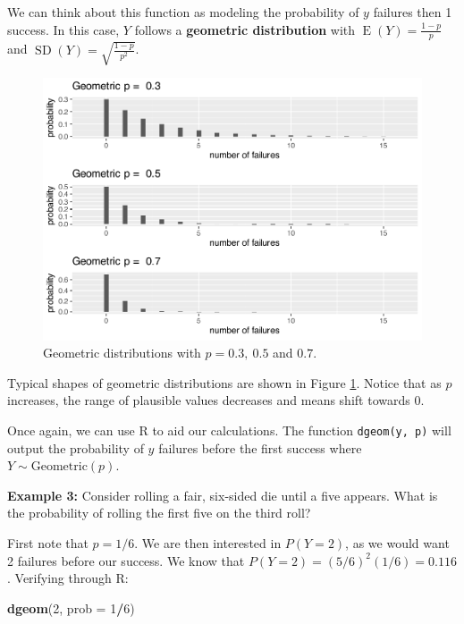 \documentclass[
]{krantz}
\newenvironment{Shaded}{\begin{snugshade}}{\end{snugshade}}
\newcommand{\DataTypeTok}[1]{\textcolor[rgb]{0.27,0.27,0.27}{#1}}
\newcommand{\DecValTok}[1]{\textcolor[rgb]{0.06,0.06,0.06}{#1}}
\newcommand{\KeywordTok}[1]{\textcolor[rgb]{0.27,0.27,0.27}{\textbf{#1}}}
\newcommand{\NormalTok}[1]{#1}
\newcommand{\OperatorTok}[1]{\textcolor[rgb]{0.43,0.43,0.43}{\textbf{#1}}}
\newcommand{\E}{\operatorname{E}}
\newcommand{\SD}{\operatorname{SD}}
\begin{document}
We can think about this function as modeling the probability of \(y\) failures then 1 success. In this case, \(Y\) follows a \textbf{geometric distribution}  with \(\E(Y) = \frac{1-p}p\) and \(\SD(Y) = \sqrt{\frac{1-p}{p^2}}\).



\begin{figure}

{\centering \includegraphics[width=0.6\linewidth]{bookdown-BeyondMLR_files/figure-latex/multGeo-1} 

}

\caption{Geometric distributions with \(p = 0.3,\ 0.5\) and \(0.7\).}\label{fig:multGeo}
\end{figure}

Typical shapes of geometric distributions are shown in Figure \ref{fig:multGeo}. Notice that as \(p\) increases, the range of plausible values decreases and means shift towards 0.

Once again, we can use R to aid our calculations. The function \texttt{dgeom(y,\ p)} will output the probability of \(y\) failures before the first success where \(Y \sim \textrm{Geometric}(p)\).

\textbf{Example 3:} Consider rolling a fair, six-sided die until a five appears. What is the probability of rolling the first five on the third roll?

First note that \(p = 1/6\). We are then interested in \(P(Y=2)\), as we would want 2 failures before our success. We know that \(P(Y=2) = (5/6)^2(1/6) = 0.116\). Verifying through R:

\begin{Shaded}
\begin{Highlighting}[]
\KeywordTok{dgeom}\NormalTok{(}\DecValTok{2}\NormalTok{, }\DataTypeTok{prob =} \DecValTok{1}\OperatorTok{/}\DecValTok{6}\NormalTok{)}
\end{Highlighting}
\end{Shaded}
\end{document}
